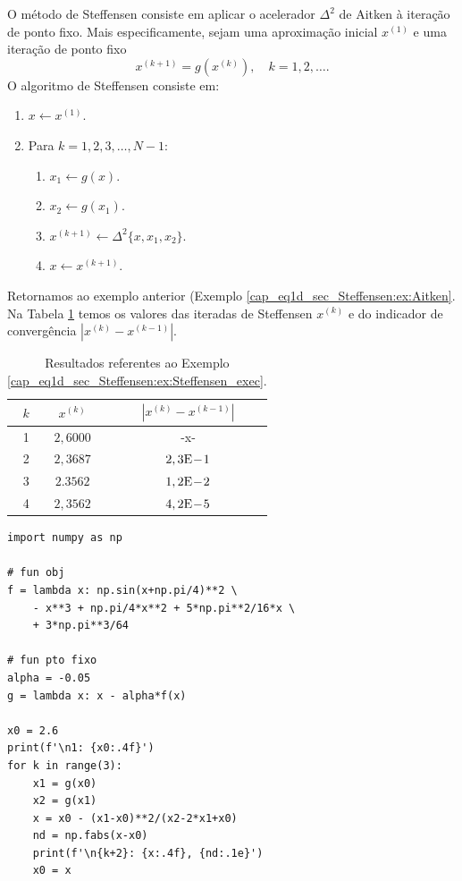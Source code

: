 O método de Steffensen consiste em aplicar o acelerador $\Delta^2$ de Aitken à iteração de ponto fixo. Mais especificamente, sejam uma aproximação inicial $x^{(1)}$ e uma iteração de ponto fixo
\begin{equation}
  x^{(k+1)} = g(x^{(k)}),\quad k=1,2,\ldots.
\end{equation}
O algoritmo de Steffensen consiste em:
\begin{enumerate}
\item $x \leftarrow x^{(1)}$.
\item Para $k=1,2,3,\dotsc, N-1$:
  \begin{enumerate}
  \item $x_1 \leftarrow g(x)$.
  \item $x_2 \leftarrow g(x_1)$.
  \item $x^{(k+1)} \leftarrow \Delta^2\{x,x_1,x_2\}$.
  \item $x \leftarrow x^{(k+1)}$.
  \end{enumerate}
\end{enumerate}


\begin{ex}\label{cap_eq1d_sec_Steffensen:ex:Steffensen_exec}
  Retornamos ao exemplo anterior (Exemplo \ref{cap_eq1d_sec_Steffensen:ex:Aitken}. Na Tabela \ref{cap_eq1d_sec_Steffensen:tab:ex_Steffensen_exec} temos os valores das iteradas de Steffensen $x^{(k)}$ e do indicador de convergência $|x^{(k)}-x^{(k-1)}|$.

\begin{table}[h!]
  \centering
  \caption{Resultados referentes ao Exemplo \ref{cap_eq1d_sec_Steffensen:ex:Steffensen_exec}.}
  \label{cap_eq1d_sec_Steffensen:tab:ex_Steffensen_exec}
  \begin{tabular}{r|cc}
    $k$ & $x^{(k)}$ & $|x^{(k)}-x^{(k-1)}|$ \\\hline
    1 & $2,6000$ & -x- \\
    2 & $2,3687$ & $2,3\mathrm{E}\!-\!1$ \\
    3 & $2.3562$ & $1,2\mathrm{E}\!-\!2$ \\
    4 & $2,3562$ & $4,2\mathrm{E}\!-\!5$ \\\hline
  \end{tabular}
\end{table}

\begin{lstlisting}
import numpy as np

# fun obj
f = lambda x: np.sin(x+np.pi/4)**2 \
    - x**3 + np.pi/4*x**2 + 5*np.pi**2/16*x \
    + 3*np.pi**3/64

# fun pto fixo
alpha = -0.05
g = lambda x: x - alpha*f(x)

x0 = 2.6
print(f'\n1: {x0:.4f}')
for k in range(3):
    x1 = g(x0)
    x2 = g(x1)
    x = x0 - (x1-x0)**2/(x2-2*x1+x0)
    nd = np.fabs(x-x0)
    print(f'\n{k+2}: {x:.4f}, {nd:.1e}')
    x0 = x
\end{lstlisting}
\end{ex}

